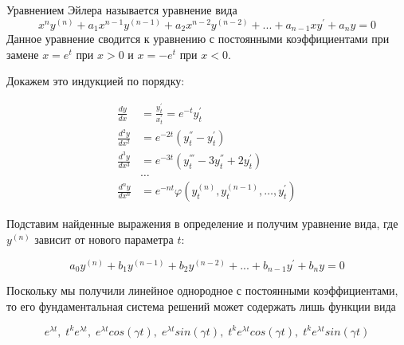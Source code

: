 Уравнением Эйлера называется уравнение вида
\[
x^n y^{(n)} + a_1 x^{n-1} y^{(n-1)} + a_2 x^{n-2} y^{(n-2)} + ... + a_{n-1} x y^{'} + a_n y = 0
\]
Данное уравнение сводится к уравнению с постоянными коэффициентами при замене $x = e^t$ при $x > 0$ и  $x = -e^t$ при $x < 0$.
 
Докажем это индукцией по порядку:

\begin{align*}
    \frac{dy}{dx} &= \frac{y^{'}_t}{x^{'}_t} = e^{-t} y^{'}_t\\
    \frac{d^2 y}{dx^2} &= e^{-2t} ( y^{''}_t - y^{'}_t)\\
    \frac{d^3 y}{dx^3} &= e^{-3t} ( y^{'''}_t - 3y^{''}_t + 2 y^{'}_t)\\
    &\ldots\\
    \frac{d^n y}{dx^n} &=  e^{-nt} \varphi(y^{(n)}_t, y^{(n-1)}_t, \ldots, y^{'}_t)
\end{align*}

Подставим найденные выражения в определение и получим уравнение вида, где $y^{(n)}$ зависит от нового параметра $t$:

\[a_0 y^{(n)} + b_1 y^{(n-1)} + b_2 y^{(n-2)} + ... + b_{n-1} y^{'} + b_n y = 0\]

Поскольку мы получили линейное однородное с постоянными коэффициентами, то его фундаментальная система решений может содержать лишь функции вида

\[ e^{\lambda t}, \;  t^k e^{\lambda t}, \;  e^{\lambda t} cos(\gamma t), \;  e^{\lambda t} sin(\gamma t), \; 
 t^k e^{\lambda t}  cos(\gamma t), \; 
  t^k e^{\lambda t}  sin(\gamma t) \]